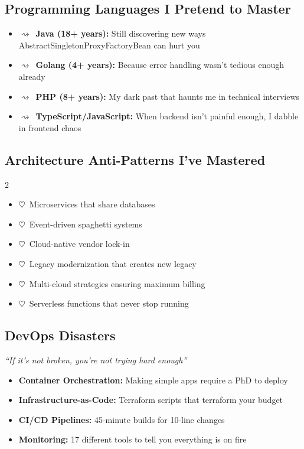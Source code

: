 \documentclass[11pt,a4paper]{article}
\newcommand{\heartstab}{{\color{heartcolor}$\heartsuit$}}
\newcommand{\squigglearrow}{{\color{squigglecolor}$\rightsquigarrow$}}
\newcommand{\antiemph}[1]{{\color{anticolor}\textbf{#1}}}
\begin{document}
\subsection{Programming Languages I Pretend to Master}
\begin{itemize}[leftmargin=*,itemsep=0pt]
    \item \squigglearrow\ \textbf{Java (18+ years):} Still discovering new ways AbstractSingletonProxyFactoryBean can hurt you
    \item \squigglearrow\ \textbf{Golang (4+ years):} Because error handling wasn't tedious enough already
    \item \squigglearrow\ \textbf{PHP (8+ years):} My dark past that haunts me in technical interviews
    \item \squigglearrow\ \textbf{TypeScript/JavaScript:} When backend isn't painful enough, I dabble in frontend chaos
\end{itemize}
\subsection{Architecture Anti-Patterns I've Mastered}
\begin{multicols}{2}
\begin{itemize}[leftmargin=*,itemsep=0pt,topsep=0pt]
    \item \heartstab\ Microservices that share databases
    \item \heartstab\ Event-driven spaghetti systems
    \item \heartstab\ Cloud-native vendor lock-in
    \item \heartstab\ Legacy modernization that creates new legacy
    \item \heartstab\ Multi-cloud strategies ensuring maximum billing
    \item \heartstab\ Serverless functions that never stop running
\end{itemize}
\end{multicols}
\subsection{DevOps Disasters}
\textit{``If it's not broken, you're not trying hard enough''}
\begin{itemize}[leftmargin=*,itemsep=0pt]
    \item \antiemph{Container Orchestration:} Making simple apps require a PhD to deploy
    \item \antiemph{Infrastructure-as-Code:} Terraform scripts that terraform your budget
    \item \antiemph{CI/CD Pipelines:} 45-minute builds for 10-line changes
    \item \antiemph{Monitoring:} 17 different tools to tell you everything is on fire
\end{itemize}
\end{document}
